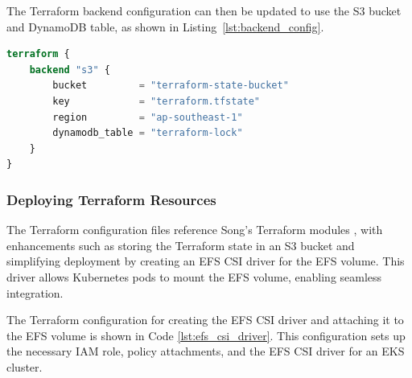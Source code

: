 The Terraform backend configuration can then be updated to use the S3 bucket and DynamoDB table, as shown in Listing~\ref{lst:backend_config}.

\begin{lstlisting}[language=Terraform, caption={Terraform Backend Configuration}, label={lst:backend_config}]
terraform {
    backend "s3" {
        bucket         = "terraform-state-bucket"
        key            = "terraform.tfstate"
        region         = "ap-southeast-1"
        dynamodb_table = "terraform-lock"
    }
}
\end{lstlisting}

\subsubsection{Deploying Terraform Resources}
The Terraform configuration files reference Song's Terraform modules \cite{song_yu}, with enhancements such as storing the Terraform state in an S3 bucket and simplifying deployment by creating an EFS CSI driver for the EFS volume. This driver allows Kubernetes pods to mount the EFS volume, enabling seamless integration.

The Terraform configuration for creating the EFS CSI driver and attaching it to the EFS volume is shown in Code \ref{lst:efs_csi_driver}. This configuration sets up the necessary IAM role, policy attachments, and the EFS CSI driver for an EKS cluster.


